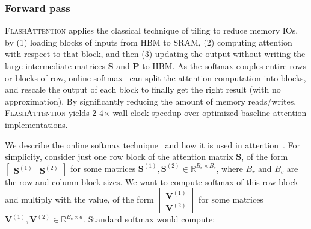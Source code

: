\subsubsection{Forward pass}
\textsc{FlashAttention} applies the classical technique of tiling to reduce memory IOs, by (1) loading blocks of inputs from HBM to SRAM, (2) computing attention with respect to that block, and then (3) updating the output without writing the large intermediate matrices $\mathbf{S}$ and $\mathbf{P}$ to HBM. As the softmax couples entire rows or blocks of row, online
softmax~\citep{milakov2018online, rabe2021self} can split the attention computation into blocks, and rescale the output of each block to finally get the right result (with no approximation). By significantly reducing the amount of memory reads/writes, \textsc{FlashAttention} yields
2-4$\times$ wall-clock speedup over optimized baseline attention implementations.

We describe the online softmax technique~\citep{milakov2018online} and how it is used in attention~\citep{rabe2021self}. For simplicity, consider just one row block of the attention matrix $\mathbf{S}$, of the form
$

\begin{bmatrix} \mathbf{S}^{(1)} & \mathbf{S}^{(2)} \end{bmatrix}

$ for some matrices
$\mathbf{S}^{(1)}, \mathbf{S}^{(2)} \in \mathbb{R}^{B_r \times B_c}$, where $B_r$ and $B_c$ are the row and column block sizes. We want to compute softmax of this row block and multiply with the value, of the form $

\begin{bmatrix} \mathbf{V}^{(1)} \\ \mathbf{V}^{(2)} \end{bmatrix}

$ for some matrices $\mathbf{V}^{(1)}, \mathbf{V}^{(2)} \in \mathbb{R}^{B_c \times d}$. Standard softmax would compute:

